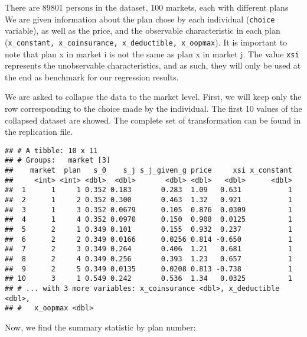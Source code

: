 \documentclass[]{article}
\begin{document}
There are 89801 persons in the dataset, 100 markets, each with different
plans We are given information about the plan chose by each individual
(\texttt{choice} variable), as well as the price, and the observable
characteristic in each plan
(\texttt{x\_constant,\ x\_coinsurance,\ x\_deductible,\ x\_oopmax}). It
is important to note that plan x in market i is not the same as plan x
in market j. The value \texttt{xsi} represents the unobservable
characteristics, and as such, they will only be used at the end as
benchmark for our regression results.

We are asked to collapse the data to the market level. First, we will
keep only the row corresponding to the choice made by the individual.
The first 10 values of the collapsed dataset are showed. The complete
set of transformation can be found in the replication file.

\begin{verbatim}
## # A tibble: 10 x 11
## # Groups:   market [3]
##    market  plan   s_0    s_j s_j_given_g price     xsi x_constant
##     <int> <int> <dbl>  <dbl>       <dbl> <dbl>   <dbl>      <dbl>
##  1      1     1 0.352 0.183       0.283  1.09   0.631           1
##  2      1     2 0.352 0.300       0.463  1.32   0.921           1
##  3      1     3 0.352 0.0679      0.105  0.876  0.0309          1
##  4      1     4 0.352 0.0970      0.150  0.908  0.0125          1
##  5      2     1 0.349 0.101       0.155  0.932  0.237           1
##  6      2     2 0.349 0.0166      0.0256 0.814 -0.650           1
##  7      2     3 0.349 0.264       0.406  1.21   0.681           1
##  8      2     4 0.349 0.256       0.393  1.23   0.657           1
##  9      2     5 0.349 0.0135      0.0208 0.813 -0.738           1
## 10      3     1 0.549 0.242       0.536  1.34   0.0325          1
## # ... with 3 more variables: x_coinsurance <dbl>, x_deductible <dbl>,
## #   x_oopmax <dbl>
\end{verbatim}

Now, we find the summary statistic by plan number:
\end{document}
